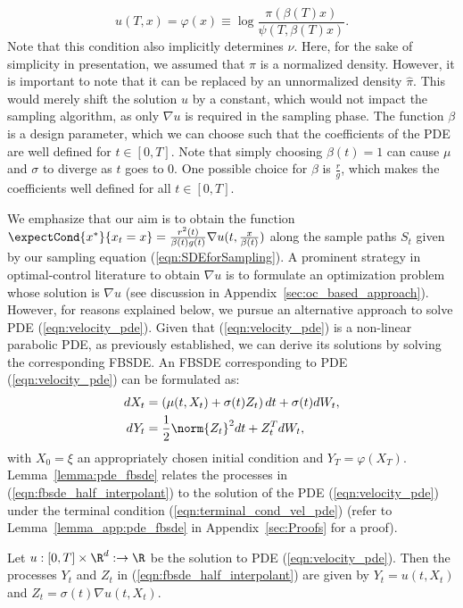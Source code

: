 \begin{equation}\label{eqn:terminal_cond_vel_pde}
 u(T, x)=\varphi(x) \equiv \log\frac{\pi(\beta(T)x)}{\psi(T,\beta(T)x)}.   
\end{equation}
Note that this condition also implicitly determines $\nu$. Here, for the sake of simplicity in presentation, we assumed that $\pi$ is a normalized density. However, it is important to note that it can be replaced by an unnormalized density $\hat{\pi}$. This would merely shift the solution $u$ by a constant, which would not impact the sampling algorithm, as only $\nabla u$ is required in the sampling phase. The function $\beta$ is a design parameter, which we can choose such that the coefficients of the PDE are well defined for $t\in[0,T]$. Note that simply choosing $\beta(t) = 1$ can cause $\mu$ and $\sigma$ to diverge as $t$ goes to $0$. One possible choice for $\beta$ is $\frac{r}{g}$, which makes the coefficients well defined for all $t\in[0,T]$. 

We emphasize that our aim is to obtain the function $\expectCond{x^*}{x_t=x} = \frac{r^2(t)}{\beta(t)g(t)}\nabla u(t,\frac{x}{\beta(t)})$ along the sample paths $S_t$ given by our sampling equation (\ref{eqn:SDEforSampling}). A prominent strategy in optimal-control literature to obtain $\nabla u$ is to formulate an optimization problem whose solution is $\nabla u$ (see discussion in Appendix~\ref{sec:oc_based_approach}). %
However, for reasons explained below, we pursue an alternative approach to solve PDE (\ref{eqn:velocity_pde}). Given that (\ref{eqn:velocity_pde}) is a non-linear parabolic PDE, as previously established, we can derive its solutions by solving the corresponding FBSDE. An FBSDE corresponding to PDE (\ref{eqn:velocity_pde}) can be formulated as:
\begin{align}\label{eqn:fbsde_half_interpolant}
\begin{split}   
    dX_t &= \left(\mu(t,X_t)+\sigma(t) Z_t\right)dt+\sigma(t)dW_t,\\
    dY_t &= \frac{1}{2}\norm{Z_t}^2dt + Z_t^TdW_t,
\end{split}
\end{align}
with $X_0=\xi$ an appropriately chosen initial condition and $Y_T=\varphi(X_T)$. Lemma~\ref{lemma:pde_fbsde} relates the processes in (\ref{eqn:fbsde_half_interpolant}) to the solution of the PDE (\ref{eqn:velocity_pde}) under the terminal condition (\ref{eqn:terminal_cond_vel_pde}) (refer to Lemma~\ref{lemma_app:pde_fbsde} in Appendix~\ref{sec:Proofs} for a proof).
\begin{lemma}\label{lemma:pde_fbsde}
    Let $u:[0,T]\times\R^d:\rightarrow\R$ be the solution to PDE (\ref{eqn:velocity_pde}). Then the processes $Y_t$ and $Z_t$ in (\ref{eqn:fbsde_half_interpolant}) are given by $Y_t=u(t,X_t)$ and $Z_t=\sigma(t)\nabla u(t,X_t)$.
\end{lemma}
